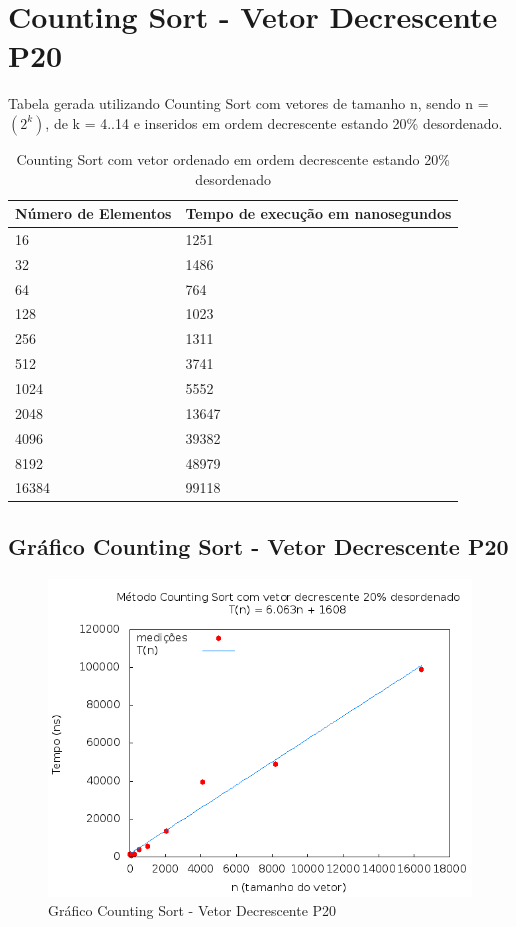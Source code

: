 \documentclass[12pt,a4paper,twoside]{report}
\begin{document}
\section{Counting Sort - Vetor Decrescente P20}
Tabela gerada utilizando Counting Sort com vetores de tamanho n, sendo n = $(2^k)$, de k = 4..14 e inseridos em ordem decrescente estando 20\% desordenado.
\begin{table}[H]
\centering
\caption{Counting Sort com vetor ordenado em ordem decrescente estando 20\% desordenado}
\label{my-label}
\begin{tabular}{|l|l|}
\hline
\multicolumn{1}{|c|}{\textbf{Número de Elementos}} & \multicolumn{1}{c|}{\textbf{Tempo de execução em nanosegundos}} \\ \hline
16 & 1251 \\ \hline
32 & 1486 \\ \hline
64 & 764 \\ \hline
128 & 1023 \\ \hline
256 & 1311 \\ \hline
512 & 3741 \\ \hline
1024 & 5552 \\ \hline
2048 & 13647 \\ \hline
4096 & 39382 \\ \hline
8192 & 48979 \\ \hline
16384 & 99118 \\ \hline
\end{tabular}
\end{table}

\subsection{Gráfico Counting Sort - Vetor Decrescente P20}
\begin{figure}[H]
    \centering
    \includegraphics[width=0.7\linewidth]{graficos/CountingSort/vIntDecrescenteP20/vIntDecrescenteP20.png}
  \caption{Gráfico Counting Sort - Vetor Decrescente P20}
\end{figure}
\end{document}
